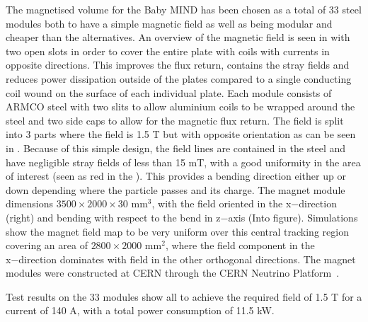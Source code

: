 The magnetised volume for the Baby MIND has been chosen as a total of 33 steel modules both to have a simple magnetic field as well as being modular and cheaper than the alternatives. An overview of the magnetic field is seen in  with two open slots in order to cover the entire plate with coils with currents in opposite directions. This improves the flux return, contains the stray fields and reduces power dissipation outside of the plates compared to a single conducting coil wound on the surface of each individual plate. Each module consists of ARMCO steel with two slits to allow aluminium coils to be wrapped around the steel and two side caps to allow for the magnetic flux return. The field is split into 3 parts where the field is 1.5 T but with opposite orientation as can be seen in . Because of this simple design, the field lines are contained in the steel and have negligible stray fields of less than 15 mT, with a good uniformity in the area of interest (seen as red in the ). This provides a bending direction either up or down depending where the particle passes and its charge. The magnet module dimensions $3500 \times 2000 \times 30$ mm$^3$, with the field oriented in the x−direction (right) and bending with respect to the bend in z−axis (Into figure). Simulations show the magnet field map to be very uniform over this central tracking region covering an area of $2800 \times 2000$ mm$^2$, where the field component in the x−direction dominates with field in the other orthogonal directions. The magnet modules were constructed at CERN through the CERN Neutrino Platform~\cite{50MagnetMIND}.

Test results on the 33 modules show all to achieve the required field of 1.5 T for a current of 140 A, with a total power consumption of 11.5 kW.


